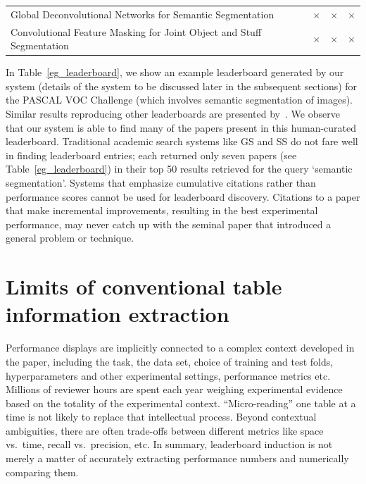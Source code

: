 \documentclass[runningheads]{llncs}
\begin{document}
\begin{table}[ht]
{\begin{tabular}{lccc}
\normalsize Global Deconvolutional Networks for Semantic Segmentation&\cellcolor{red!20}$\times$&\cellcolor{red!20}$\times$&\cellcolor{red!20}$\times$\\
\normalsize Convolutional Feature Masking for Joint Object and Stuff Segmentation&\cellcolor{red!20}$\times$&\cellcolor{red!20}$\times$&\cellcolor{red!20}$\times$\\
\bottomrule \hline
\end{tabular} }
\end{table}


In Table~\ref{eg_leaderboard}, we show an example leaderboard generated by our system (details of the system to be discussed later in the subsequent sections) for the PASCAL VOC Challenge (which involves semantic segmentation of images).  Similar results reproducing other leaderboards are presented by~\citet{SinghSVGMC2019TabCite}.  We observe that our system is able to find many of the papers present in this human-curated leaderboard.  Traditional academic search systems like GS and SS do not fare well in finding leaderboard entries; each returned only seven papers (see Table~\ref{eg_leaderboard}) in their top 50 results retrieved for the query `semantic segmentation'.  Systems that emphasize cumulative citations rather than performance scores cannot be used for leaderboard discovery.  Citations to a paper that make incremental improvements, resulting in the best experimental performance, may never catch up with the seminal paper that introduced a general problem or technique.



\section{Limits of conventional table information extraction}
\label{limitsofie}

Performance displays are implicitly connected to a complex context developed in the paper, including the task, the data set, choice of training and test folds, hyperparameters and other experimental settings, performance metrics etc.  Millions of reviewer hours are spent each year weighing experimental evidence based on the totality of the experimental context.  ``Micro-reading'' one table at a time is not likely to replace that intellectual process.   Beyond contextual ambiguities, there are often trade-offs between different metrics like space vs.\ time, recall vs.\ precision, etc.  In summary, leaderboard induction is not merely a matter of accurately extracting performance numbers and numerically comparing them.
\end{document}

